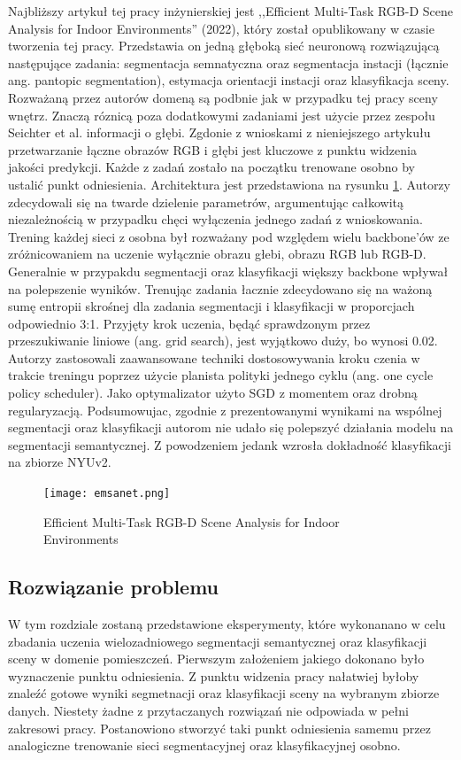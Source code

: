 Najbliższy artykuł tej pracy inżynierskiej jest ,,Efficient Multi-Task RGB-D Scene Analysis for Indoor Environments'' \cite{9892852} (2022), który został opublikowany w czasie tworzenia tej pracy. Przedstawia on jedną głęboką sieć neuronową rozwiązującą następujące zadania: segmentacja semnatyczna oraz segmentacja instacji (łącznie ang. pantopic segmentation), estymacja orientacji instacji oraz klasyfikacja sceny. Rozważaną przez autorów domeną są podbnie jak w przypadku tej pracy sceny wnętrz. Znaczą róznicą poza dodatkowymi zadaniami jest użycie przez zespołu Seichter et al. informacji o głębi. Zgdonie z wnioskami z nieniejszego artykułu przetwarzanie łączne obrazów RGB i głębi jest kluczowe z punktu widzenia jakości predykcji. Każde z zadań zostało na początku trenowane osobno by ustalić punkt odniesienia. Architektura jest przedstawiona na rysunku \ref{fig:emsanet}. Autorzy zdecydowali się na twarde dzielenie parametrów, argumentując całkowitą niezależnością w przypadku chęci wyłączenia jednego zadań z wnioskowania. Trening każdej sieci z osobna był rozważany pod względem wielu backbone'ów ze zróżnicowaniem na uczenie wyłącznie obrazu głebi, obrazu RGB lub RGB-D. Generalnie w przypakdu segmentacji oraz klasyfikacji większy backbone wpływał na polepszenie wyników. Trenując zadania łacznie zdecydowano się na ważoną sumę entropii skrośnej dla zadania segmentacji i klasyfikacji w proporcjach odpowiednio 3:1. Przyjęty krok uczenia, będąć sprawdzonym przez przeszukiwanie liniowe (ang. grid search), jest wyjątkowo duży, bo wynosi 0.02. Autorzy zastosowali zaawansowane techniki dostosowywania kroku czenia w trakcie treningu poprzez użycie planista polityki jednego cyklu (ang. one cycle policy scheduler). Jako optymalizator użyto SGD z momentem oraz drobną regularyzacją. Podsumowujac, zgodnie z prezentowanymi wynikami na wspólnej segmentacji oraz klasyfikacji autorom nie udało się polepszyć działania modelu na segmentacji semantycznej. Z powodzeniem jedank wzrosła dokładność klasyfikacji na zbiorze NYUv2.

\begin{figure}[ht!]
    \centering
    \texttt{[image: emsanet.png]}
    \caption{Efficient Multi-Task RGB-D Scene Analysis for Indoor Environments \cite{9892852}}
    \label{fig:emsanet}
\end{figure}


\subsection{Rozwiązanie problemu}
W tym rozdziale zostaną przedstawione eksperymenty, które wykonanano w celu zbadania uczenia wielozadniowego segmentacji semantycznej oraz klasyfikacji sceny w domenie pomieszczeń. Pierwszym założeniem jakiego dokonano było wyznaczenie punktu odniesienia. Z punktu widzenia pracy nałatwiej byłoby znaleźć gotowe wyniki segmetnacji oraz klasyfikacji sceny na wybranym zbiorze danych. Niestety żadne z przytaczanych rozwiązań nie odpowiada w pełni zakresowi pracy. Postanowiono stworzyć taki punkt odniesienia samemu przez analogiczne trenowanie sieci segmentacyjnej oraz klasyfikacyjnej osobno.

